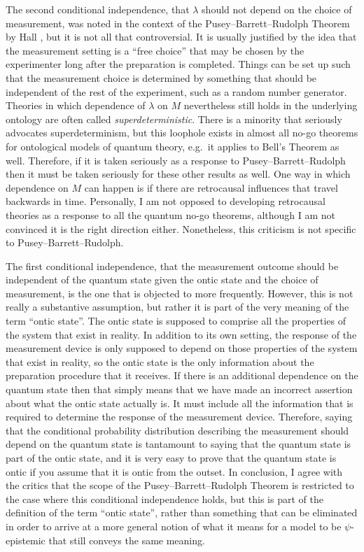 \documentclass[DIV=calc,paper=a4,fontsize=11pt,twocolumn]{scrartcl} %
\theoremstyle{definition}
\theoremstyle{plain}
\begin{document}
The second conditional independence, that $\lambda$ should not depend
on the choice of measurement, was noted in the context of the
Pusey--Barrett--Rudolph Theorem by Hall \cite{Hall2011}, but it is not
all that controversial.  It is usually justified by the idea that the
measurement setting is a ``free choice'' that may be chosen by the
experimenter long after the preparation is completed.  Things can be
set up such that the measurement choice is determined by something
that should be independent of the rest of the experiment, such as a
random number generator.  Theories in which dependence of $\lambda$ on
$M$ nevertheless still holds in the underlying ontology are often
called \emph{superdeterministic}.  There is a minority that seriously
advocates superdeterminism, but this loophole exists in almost all
no-go theorems for ontological models of quantum theory, e.g.\ it
applies to Bell's Theorem as well.  Therefore, if it is taken
seriously as a response to Pusey--Barrett--Rudolph then it must be
taken seriously for these other results as well.  One way in which
dependence on $M$ can happen is if there are retrocausal influences
that travel backwards in time.  Personally, I am not opposed to
developing retrocausal theories as a response to all the quantum no-go
theorems, although I am not convinced it is the right direction
either.  Nonetheless, this criticism is not specific to
Pusey--Barrett--Rudolph.

The first conditional independence, that the measurement outcome
should be independent of the quantum state given the ontic state and
the choice of measurement, is the one that is objected to more
frequently.  However, this is not really a substantive assumption, but
rather it is part of the very meaning of the term ``ontic state''.
The ontic state is supposed to comprise all the properties of the
system that exist in reality.  In addition to its own setting, the
response of the measurement device is only supposed to depend on those
properties of the system that exist in reality, so the ontic state is
the only information about the preparation procedure that it receives.
If there is an additional dependence on the quantum state then that
simply means that we have made an incorrect assertion about what the
ontic state actually is.  It must include all the information that is
required to determine the response of the measurement device.
Therefore, saying that the conditional probability distribution
describing the measurement should depend on the quantum state is
tantamount to saying that the quantum state is part of the ontic
state, and it is very easy to prove that the quantum state is ontic if
you assume that it is ontic from the outset.  In conclusion, I agree
with the critics that the scope of the Pusey--Barrett--Rudolph Theorem is restricted to
the case where this conditional independence holds, but this is part
of the definition of the term ``ontic state'', rather than something
that can be eliminated in order to arrive at a more general notion of
what it means for a model to be $\psi$-epistemic that still conveys
the same meaning.
\end{document}
